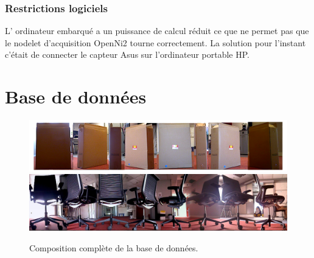 \subsection{Restrictions logiciels}
L' ordinateur embarqué a un puissance de calcul réduit ce que ne permet pas que le nodelet d'acquisition OpenNi2 tourne correctement. La solution pour l'instant c'était de connecter le capteur Asus sur l'ordinateur portable HP.

\chapter{Base de données }
\label{annexe:dataset}
\begin{figure}[H]
	\includegraphics[width=\textwidth]{box_seq.png}
	\includegraphics[width=\textwidth]{chair_db.jpg}
	\label{fig:dataset}
	\caption{Composition complète de la base de données.}
\end{figure}

\begin{figure}[H]
\end{figure}

\begin{figure}[H]
\end{figure}




